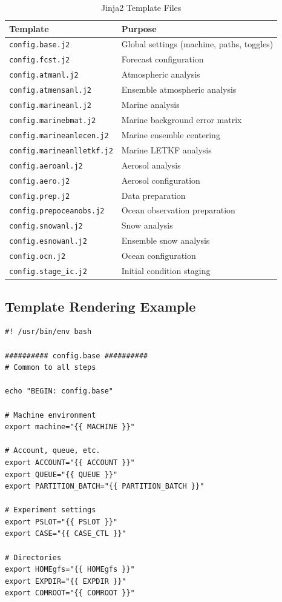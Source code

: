 \documentclass[11pt,letterpaper]{article}
\begin{document}
\begin{table}[H]
\centering
\caption{Jinja2 Template Files}
\label{tab:j2-templates}
\begin{tabular}{@{}lp{7cm}@{}}
\toprule
\textbf{Template} & \textbf{Purpose} \\
\midrule
\texttt{config.base.j2} & Global settings (machine, paths, toggles) \\
\texttt{config.fcst.j2} & Forecast configuration \\
\texttt{config.atmanl.j2} & Atmospheric analysis \\
\texttt{config.atmensanl.j2} & Ensemble atmospheric analysis \\
\texttt{config.marineanl.j2} & Marine analysis \\
\texttt{config.marinebmat.j2} & Marine background error matrix \\
\texttt{config.marineanlecen.j2} & Marine ensemble centering \\
\texttt{config.marineanlletkf.j2} & Marine LETKF analysis \\
\texttt{config.aeroanl.j2} & Aerosol analysis \\
\texttt{config.aero.j2} & Aerosol configuration \\
\texttt{config.prep.j2} & Data preparation \\
\texttt{config.prepoceanobs.j2} & Ocean observation preparation \\
\texttt{config.snowanl.j2} & Snow analysis \\
\texttt{config.esnowanl.j2} & Ensemble snow analysis \\
\texttt{config.ocn.j2} & Ocean configuration \\
\texttt{config.stage\_ic.j2} & Initial condition staging \\
\bottomrule
\end{tabular}
\end{table}

\subsection{Template Rendering Example}

\begin{lstlisting}[style=bashstyle, title=config.base.j2 Template (Excerpt)]
#! /usr/bin/env bash

########## config.base ##########
# Common to all steps

echo "BEGIN: config.base"

# Machine environment
export machine="{{ MACHINE }}"

# Account, queue, etc.
export ACCOUNT="{{ ACCOUNT }}"
export QUEUE="{{ QUEUE }}"
export PARTITION_BATCH="{{ PARTITION_BATCH }}"

# Experiment settings
export PSLOT="{{ PSLOT }}"
export CASE="{{ CASE_CTL }}"

# Directories
export HOMEgfs="{{ HOMEgfs }}"
export EXPDIR="{{ EXPDIR }}"
export COMROOT="{{ COMROOT }}"
\end{lstlisting}
\end{document}
